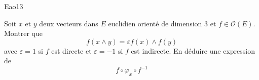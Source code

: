\begin{tiny}Eao13\end{tiny} Soit $x$ et $y$ deux vecteurs dans $E$ euclidien orienté de dimension $3$ et $f\in \mathcal O(E)$. Montrer que 
\begin{displaymath}
f(x\wedge y)=\varepsilon f(x)\wedge f(y) 
\end{displaymath}
avec $\varepsilon=1$ si $f$ est directe et $\varepsilon=-1$ si $f$ est indirecte.\newline
En déduire une expression de 
\begin{displaymath}
 f\circ \varphi_x \circ f^{-1}
\end{displaymath}
 